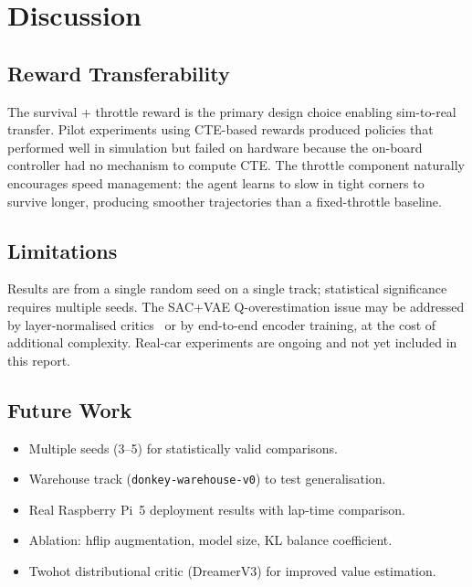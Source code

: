 \documentclass[10pt,twocolumn]{article}
\begin{document}
\section{Discussion}

\subsection{Reward Transferability}
The survival + throttle reward is the primary design choice enabling
sim-to-real transfer. Pilot experiments using CTE-based rewards produced
policies that performed well in simulation but failed on hardware because
the on-board controller had no mechanism to compute CTE.
The throttle component naturally encourages speed management:
the agent learns to slow in tight corners to survive longer,
producing smoother trajectories than a fixed-throttle baseline.

\subsection{Limitations}
Results are from a single random seed on a single track;
statistical significance requires multiple seeds.
The SAC+VAE Q-overestimation issue may be addressed by
layer-normalised critics~\cite{bjorck2021high} or by end-to-end
encoder training, at the cost of additional complexity.
Real-car experiments are ongoing and not yet included in this report.

\subsection{Future Work}
\begin{itemize}[leftmargin=1.2em, itemsep=1pt, topsep=2pt]
  \item Multiple seeds (3--5) for statistically valid comparisons.
  \item Warehouse track (\texttt{donkey-warehouse-v0}) to test generalisation.
  \item Real Raspberry Pi~5 deployment results with lap-time comparison.
  \item Ablation: hflip augmentation, model size, KL balance coefficient.
  \item Twohot distributional critic (DreamerV3) for improved value estimation.
\end{itemize}

\end{document}
